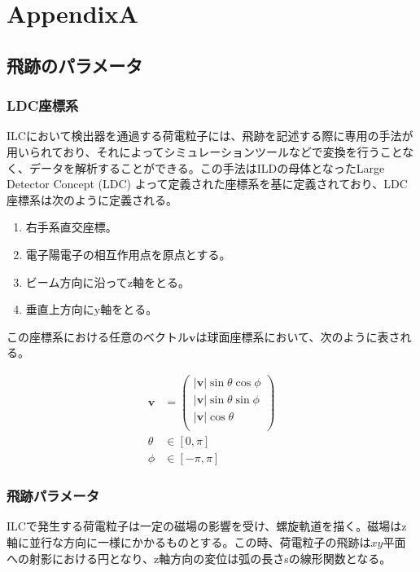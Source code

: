 
\appendix 

\chapter{AppendixA} \label{sec:Appendix}
\section{飛跡のパラメータ}
\subsection{LDC座標系}
ILCにおいて検出器を通過する荷電粒子には、飛跡を記述する際に専用の手法が用いられており、それによってシミュレーションツールなどで変換を行うことなく、データを解析することができる。この手法はILDの母体となったLarge Detector Concept (LDC) よって定義された座標系\cite{ldc}を基に定義されており、LDC座標系は次のように定義される。
\begin{enumerate}
\item 右手系直交座標。
\item 電子陽電子の相互作用点を原点とする。
\item ビーム方向に沿ってz軸をとる。
\item 垂直上方向にy軸をとる。
\end{enumerate}

この座標系における任意のベクトル$\bm{v}$は球面座標系において、次のように表される。

\begin{align}
\mathbf{v} &= \left(
\begin{array}{c}
|\mathbf{v}| \sin \theta \cos \phi \\
|\mathbf{v}| \sin \theta \sin \phi \\
|\mathbf{v}| \cos \theta \\
\end{array}
\right) \\
\nonumber \theta& \in [0,\pi ] \\
\nonumber \phi &\in [-\pi , \pi ]
\end{align}

\subsection{飛跡パラメータ}
ILCで発生する荷電粒子は一定の磁場の影響を受け、螺旋軌道を描く。磁場はz軸に並行な方向に一様にかかるものとする。この時、荷電粒子の飛跡は$xy$平面への射影における円となり、z軸方向の変位は弧の長さsの線形関数となる。

